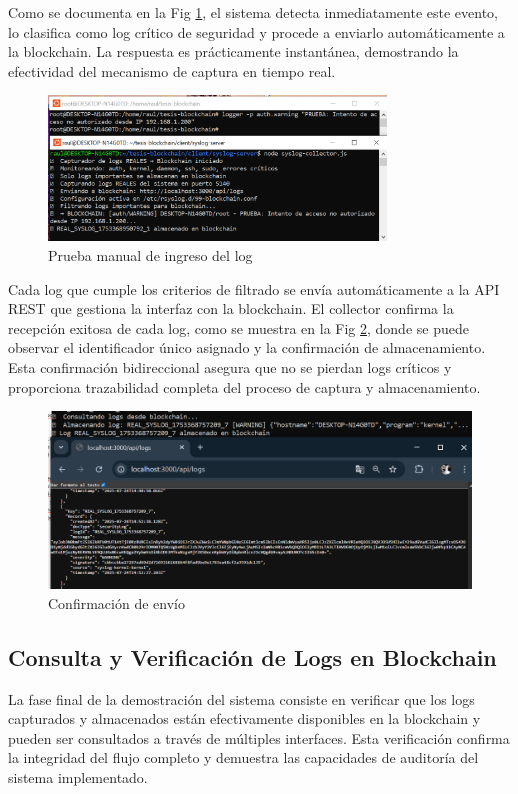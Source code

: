 Como se documenta en la Fig \ref{fig:prueba_manual}, el sistema detecta inmediatamente este evento, lo clasifica como log crítico de seguridad y procede a enviarlo automáticamente a la blockchain. La respuesta es prácticamente instantánea, demostrando la efectividad del mecanismo de captura en tiempo real.
\begin{figure}[H]
    \centering
    \includegraphics[width=0.8\textwidth]{figuras/prueba_manual.png}
    \caption{Prueba manual de ingreso del log}
    \label{fig:prueba_manual}
\end{figure}

Cada log que cumple los criterios de filtrado se envía automáticamente a la API REST que gestiona la interfaz con la blockchain. El collector confirma la recepción exitosa de cada log, como se muestra en la Fig \ref{fig:confirmacion_envio}, donde se puede observar el identificador único asignado y la confirmación de almacenamiento.
Esta confirmación bidireccional asegura que no se pierdan logs críticos y proporciona trazabilidad completa del proceso de captura y almacenamiento.

\begin{figure}[H]
    \centering
    \includegraphics[width=1\textwidth]{figuras/confirmacion_envio.png}
    \caption{Confirmación de envío}
    \label{fig:confirmacion_envio}
\end{figure}

\subsection{Consulta y Verificación de Logs en Blockchain}
La fase final de la demostración del sistema consiste en verificar que los logs capturados y almacenados están efectivamente disponibles en la blockchain y pueden ser consultados a través de múltiples interfaces. Esta verificación confirma la integridad del flujo completo y demuestra las capacidades de auditoría del sistema implementado.

